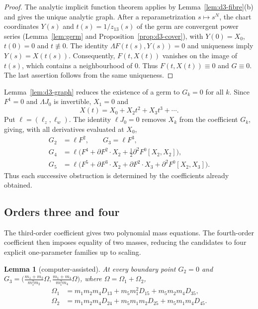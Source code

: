 \documentclass[Threeside,11pt]{article}
\newtheorem{lemma}[theorem]{Lemma}
\theoremstyle{definition}
\theoremstyle{remark}
\numberwithin{equation}{section}
\theoremstyle{remark}
\begin{document}
\begin{proof}
{The analytic implicit function theorem applies by Lemma~\ref{lem:d3-fibre}(b)
and gives the unique analytic graph. After a reparametrization $s\mapsto s^N$,
the chart coordinates $Y(s)$ and $t(s)=1/z_{13}(s)$ of the germ are convergent power series
(Lemma~\ref{lem:germ} and Proposition~\ref{prop:d3-cover}), with $Y(0)=X_0$, $t(0)=0$ and
$t\not\equiv0$. The identity $\Lambda F(t(s),Y(s))=0$ and uniqueness imply
$Y(s)=X(t(s))$. Consequently, $F(t,X(t))$ vanishes on the image of $t(s)$,
which contains a neighbourhood of $0$. Thus $F(t,X(t))\equiv0$ and $G\equiv0$.
The last assertion follows from the same uniqueness.}
\end{proof}

{Lemma~\ref{lem:d3-graph} reduces the existence of a germ to $G_k=0$ for all $k$.
Since $F^1=0$ and $\Lambda J_0$ is invertible, $X_1=0$ and
\[
 X(t)=X_0+X_2t^2+X_3t^3+\cdots.
\]
Put $\ell=(\ell_z,\ell_w)$. The identity $\ell J_0=0$ removes $X_k$ from the
coefficient $G_k$, giving, with all derivatives evaluated at $X_0$,
\[
\begin{aligned}
 G_2&=\ell F^2,\qquad G_3=\ell F^3,\\
 G_4&=\ell\bigl(F^4+\partial F^2\cdot X_2
                  +\tfrac12\partial^2F^0[X_2,X_2]\bigr),\\
 G_5&=\ell\bigl(F^5+\partial F^3\cdot X_2+\partial F^2\cdot X_3
                  +\partial^2F^0[X_2,X_3]\bigr).
\end{aligned}
\]
Thus each successive obstruction is determined by the coefficients already obtained.}

\subsection{Orders three and four}

The third-order coefficient gives two polynomial mass equations. The fourth-order
coefficient then imposes equality of two masses, reducing the candidates to four
explicit one-parameter families up to scaling.

\begin{lemma}[computer-assisted]\label{lem:d3-order3}
At every boundary point $G_2=0$ and
$G_3=\bigl(\frac{m_1+m_2}{m_1^2m_2}\Omega,\frac{m_1+m_4}{m_1^2m_4}\Omega\bigr)$, where
$\Omega=\Omega_1+\Omega_2$,
\[
\begin{aligned}
\Omega_1&=m_1m_2m_4D_{13}+m_5m_1^2D_{15}+m_5m_2m_4D_{35},\\
\Omega_2&=m_1m_2m_4D_{24}+m_5m_1m_2D_{25}+m_5m_1m_4D_{45}.
\end{aligned}
\]
\end{lemma}
\end{document}
